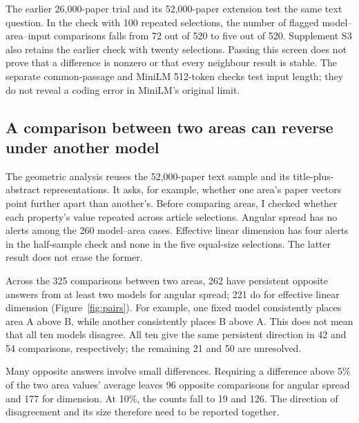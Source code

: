 \documentclass[12pt]{article}
\begin{document}
The earlier 26,000-paper trial and its 52,000-paper extension test the same text question. In the check with 100 repeated selections, the number of flagged model--area--input comparisons falls from 72 out of 520 to five out of 520. Supplement S3 also retains the earlier check with twenty selections. Passing this screen does not prove that a difference is nonzero or that every neighbour result is stable. The separate common-passage and MiniLM 512-token checks test input length; they do not reveal a coding error in MiniLM's original limit.

\FloatBarrier
\subsection{A comparison between two areas can reverse under another model}
The geometric analysis reuses the 52,000-paper text sample and its title-plus-abstract representations. It asks, for example, whether one area's paper vectors point further apart than another's. Before comparing areas, I checked whether each property's value repeated across article selections. Angular spread has no alerts among the 260 model--area cases. Effective linear dimension has four alerts in the half-sample check and none in the five equal-size selections. The latter result does not erase the former.

Across the 325 comparisons between two areas, 262 have persistent opposite answers from at least two models for angular spread; 221 do for effective linear dimension (Figure~\ref{fig:pairs}). For example, one fixed model consistently places area A above B, while another consistently places B above A. This does not mean that all ten models disagree. All ten give the same persistent direction in 42 and 54 comparisons, respectively; the remaining 21 and 50 are unresolved.

Many opposite answers involve small differences. Requiring a difference above 5\% of the two area values' average leaves 96 opposite comparisons for angular spread and 177 for dimension. At 10\%, the counts fall to 19 and 126. The direction of disagreement and its size therefore need to be reported together.
\end{document}
